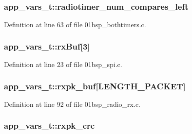 \subsubsection[{\texorpdfstring{radiotimer\+\_\+num\+\_\+compares\+\_\+left}{radiotimer_num_compares_left}}]{ app\+\_\+vars\+\_\+t\+::radiotimer\+\_\+num\+\_\+compares\+\_\+left}\hypertarget{structapp__vars__t_ada7421f16ec31b557044615641638b41}{}\label{structapp__vars__t_ada7421f16ec31b557044615641638b41}


Definition at line 63 of file 01bsp\+\_\+bothtimers.\+c.

\subsubsection[{\texorpdfstring{rx\+Buf}{rxBuf}}]{ app\+\_\+vars\+\_\+t\+::rx\+Buf\mbox{[}3\mbox{]}}\hypertarget{structapp__vars__t_a8bbd29f28e395393e4fb2a1356351f20}{}\label{structapp__vars__t_a8bbd29f28e395393e4fb2a1356351f20}


Definition at line 23 of file 01bsp\+\_\+spi.\+c.

\subsubsection[{\texorpdfstring{rxpk\+\_\+buf}{rxpk_buf}}]{ app\+\_\+vars\+\_\+t\+::rxpk\+\_\+buf\mbox{[}{\bf L\+E\+N\+G\+T\+H\+\_\+\+P\+A\+C\+K\+ET}\mbox{]}}\hypertarget{structapp__vars__t_affbd644e41b23269590ffb85561abc40}{}\label{structapp__vars__t_affbd644e41b23269590ffb85561abc40}


Definition at line 92 of file 01bsp\+\_\+radio\+\_\+rx.\+c.

\subsubsection[{\texorpdfstring{rxpk\+\_\+crc}{rxpk_crc}}]{ app\+\_\+vars\+\_\+t\+::rxpk\+\_\+crc}\hypertarget{structapp__vars__t_a2bad33a9e988689fe1bc7d164ab56bbe}{}\label{structapp__vars__t_a2bad33a9e988689fe1bc7d164ab56bbe}


